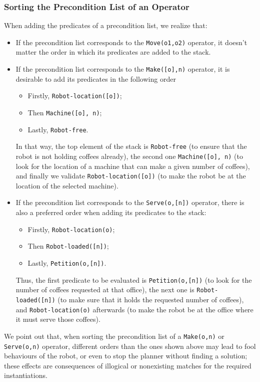 \documentclass[12pt,a4paper,oneside]{article}
\numberwithin{equation}{section}
\numberwithin{equation}{section}
\theoremstyle{definition}
\begin{document}
\subsubsection{Sorting the Precondition List of an Operator}

When adding the predicates of a precondition list, we realize that:
\begin{itemize}
	\item If the precondition list corresponds to the \texttt{Move(o1,o2)} operator, it doesn’t matter the order in which its predicates are added to the stack. 
	\item If the precondition list corresponds to the \texttt{Make([o],n)} operator, it is desirable to add its predicates in the following order
	\begin{itemize}
		\item Firstly, \texttt{Robot-location([o])};
		\item Then \texttt{Machine([o], n)};
		\item Lastly, \texttt{Robot-free}.
	\end{itemize}
	In that way, the top element of the stack is \texttt{Robot-free} (to ensure that the robot is not holding coffees already), the second one \texttt{Machine([o], n)} (to look for the location of a machine that can make a given number of coffees), and finally we validate \texttt{Robot-location([o])} (to make the robot be at the location of the selected machine). 
	\item If the precondition list corresponds to the \texttt{Serve(o,[n])} operator, there is also a preferred order when adding its predicates to the stack:
	\begin{itemize}
		\item Firstly, \texttt{Robot-location(o)};
		\item Then \texttt{Robot-loaded([n])};
		\item Lastly, \texttt{Petition(o,[n])}.
	\end{itemize}
	Thus, the first predicate to be evaluated is \texttt{Petition(o,[n])} (to look for the number of coffees requested at that office), the next one is \texttt{Robot-loaded([n])} (to make sure that it holds the requested number of coffees), and \texttt{Robot-location(o)} afterwards (to make the robot be at the office where it must serve those coffees). 
\end{itemize}

We point out that, when sorting the precondition list of a \texttt{Make(o,n)} or \texttt{Serve(o,n)} operator, different orders than the ones shown above may lead to fool behaviours of the robot, or even to stop the planner without finding a solution; these effects are consequences of illogical or nonexisting matches for the required instantiations. 
\end{document}
